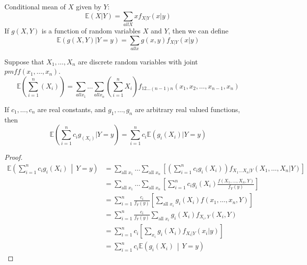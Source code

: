 \documentclass{article}
\newcommand{\E}{\mathbb{E}}
\begin{document}
\noindent Conditional mean of $X$ given by $Y$:
$$\E(X|Y) = \sum_{all X}x f_{X|Y}(x|y)$$
If $g(X,Y)$ is a function of random variables $X$ and $Y$, then we can define
$$\E(g(X,Y)|Y=y) = \sum_{all x}g(x,y)f_{X|Y}(x|y)$$

\noindent Suppose that $X_1, \dotsc, X_n$ are discrete random variables with joint $pmf f(x_1, \dotsc, x_n)$.
$$\E(\sum_{i=1}^{n}(X_i)) = \sum_{all x_1} \dotsc \sum_{all x_n}(\sum_{i=1}^{n}X_i) f_{12\dotsc(n-1)n}(x_1, x_2, \dotsc, x_{n-1}, x_n)$$

\noindent If $c_1, \dotsc, c_n$ are real constants, and $g_1, \dotsc, g_n$ are arbitrary real valued functions, then
$$\E(\sum_{i=1}^{n}c_ig_(X_i)|Y=y) = \sum_{i=1}^{n}c_i\E(g_i(X_i)|Y=y)$$
\begin{proof}
    \begin{align*}
        \E\left( \sum_{i=1}^{n}c_ig_i(X_i) \,\middle|\, Y=y \right) 
        &= \sum_{\text{all } x_1} \dotsc \sum_{\text{all } x_n} \left[ \left(\sum_{i=1}^{n}c_ig_i(X_i)\right) f_{X_1 \dotsc X_n | Y}(X_1, \dotsc, X_n|Y) \right] \\
        &= \sum_{\text{all } x_1} \dotsc \sum_{\text{all } x_n} \left[ \sum_{i=1}^{n}c_ig_i(X_i) \frac{f(X_1, \dotsc, X_n, Y)}{f_Y(y)} \right] \\
        &= \sum_{i=1}^{n}\frac{c_i}{f_Y(y)} \left[ \sum_{\text{all } x_i} g_i(X_i)f(x_1, \dotsc, x_n, Y) \right] \\
        &= \sum_{i=1}^{n}\frac{c_i}{f_Y(y)} \sum_{\text{all } x_i}g_i(X_i)f_{X_i, Y}(X_i,Y) \\
        &= \sum_{i=1}^{n}c_i \left[ \sum_{x_i} g_i(X_i) f_{X_i|Y}(x_i|y) \right] \\
        &= \sum_{i=1}^{n}c_i\E\left( g_i(X_i) \,\middle|\, Y=y \right)
    \end{align*}
\end{proof}
\end{document}
